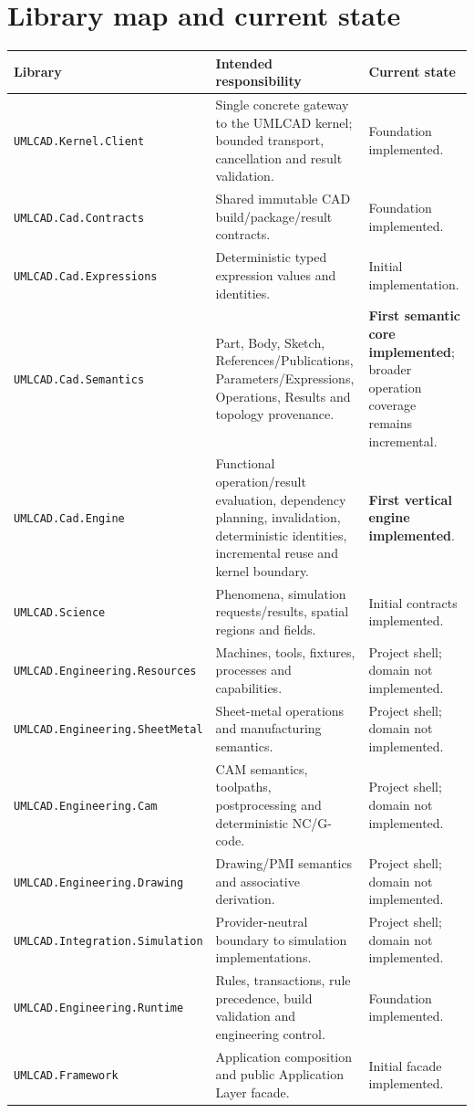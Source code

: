 \documentclass[11pt,a4paper]{report}
\begin{document}
\section{Library map and current state}

\begin{longtable}{@{}p{}p{}p{}@{}}
\toprule
Library & Intended responsibility & Current state \\
\midrule
\texttt{UMLCAD.Kernel.Client} & Single concrete gateway to the UMLCAD kernel; bounded transport, cancellation and result validation. & Foundation implemented. \\
\texttt{UMLCAD.Cad.Contracts} & Shared immutable CAD build/package/result contracts. & Foundation implemented. \\
\texttt{UMLCAD.Cad.Expressions} & Deterministic typed expression values and identities. & Initial implementation. \\
\texttt{UMLCAD.Cad.Semantics} & Part, Body, Sketch, References/Publications, Parameters/Expressions, Operations, Results and topology provenance. & \textbf{First semantic core implemented}; broader operation coverage remains incremental. \\
\texttt{UMLCAD.Cad.Engine} & Functional operation/result evaluation, dependency planning, invalidation, deterministic identities, incremental reuse and kernel boundary. & \textbf{First vertical engine implemented}. \\
\texttt{UMLCAD.Science} & Phenomena, simulation requests/results, spatial regions and fields. & Initial contracts implemented. \\
\texttt{UMLCAD.Engineering.Resources} & Machines, tools, fixtures, processes and capabilities. & Project shell; domain not implemented. \\
\texttt{UMLCAD.Engineering.SheetMetal} & Sheet-metal operations and manufacturing semantics. & Project shell; domain not implemented. \\
\texttt{UMLCAD.Engineering.Cam} & CAM semantics, toolpaths, postprocessing and deterministic NC/G-code. & Project shell; domain not implemented. \\
\texttt{UMLCAD.Engineering.Drawing} & Drawing/PMI semantics and associative derivation. & Project shell; domain not implemented. \\
\texttt{UMLCAD.Integration.Simulation} & Provider-neutral boundary to simulation implementations. & Project shell; domain not implemented. \\
\texttt{UMLCAD.Engineering.Runtime} & Rules, transactions, rule precedence, build validation and engineering control. & Foundation implemented. \\
\texttt{UMLCAD.Framework} & Application composition and public Application Layer facade. & Initial facade implemented. \\
\bottomrule
\end{longtable}
\end{document}
